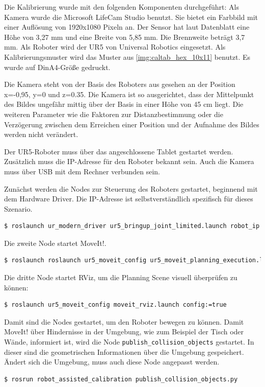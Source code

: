 Die Kalibrierung wurde mit den folgenden Komponenten durchgeführt: Als Kamera wurde die Microsoft LifeCam Studio benutzt. Sie bietet ein Farbbild mit einer Auflösung von 1920x1080 Pixeln an. Der Sensor hat laut Datenblatt eine Höhe von 3,27 mm und eine Breite von 5,85 mm. Die Brennweite beträgt 3,7 mm. Als Roboter wird der UR5 von Universal Robotics eingesetzt. Als Kalibrierungsmuster wird das Muster aus \autoref{img:caltab_hex_10x11} benutzt. Es wurde auf DinA4-Größe gedruckt.

Die Kamera steht von der Basis des Roboters aus gesehen an der Position x=-0,95, y=0 und z=0.35. Die Kamera ist so ausgerichtet, dass der Mittelpunkt des Bildes ungefähr mittig über der Basis in einer Höhe von 45 cm liegt. Die weiteren Parameter wie die Faktoren zur Distanzbestimmung oder die Verzögerung zwischen dem Erreichen einer Position und der Aufnahme des Bildes werden nicht verändert.

Der UR5-Roboter muss über das angeschlossene Tablet gestartet werden. Zusätzlich muss die IP-Adresse für den Roboter bekannt sein. Auch die Kamera muss über USB mit dem Rechner verbunden sein.

Zunächst werden die Nodes zur Steuerung des Roboters gestartet, beginnend mit dem Hardware Driver. Die IP-Adresse ist selbstverständlich spezifisch für dieses Szenario.
\begin{lstlisting}[language=bash]
  $ roslaunch ur_modern_driver ur5_bringup_joint_limited.launch robot_ip:=192.168.102.95
\end{lstlisting}
Die zweite Node startet MoveIt!.
\begin{lstlisting}[language=bash]
  $ roslaunch roslaunch ur5_moveit_config ur5_moveit_planning_execution.launch limited:=true
\end{lstlisting}
Die dritte Node startet RViz, um die Planning Scene visuell überprüfen zu können:
\begin{lstlisting}[language=bash]
  $ roslaunch ur5_moveit_config moveit_rviz.launch config:=true
\end{lstlisting}

Damit sind die Nodes gestartet, um den Roboter bewegen zu können. Damit MoveIt! über Hindernisse in der Umgebung, wie zum Beispiel der Tisch oder Wände, informiert ist, wird die Node \texttt{publish\_collision\_objects} gestartet. In dieser sind die geometrischen Informationen über die Umgebung gespeichert. Ändert sich die Umgebung, muss auch diese Node angepasst werden.
\begin{lstlisting}[language=bash]
  $ rosrun robot_assisted_calibration publish_collision_objects.py
\end{lstlisting}

